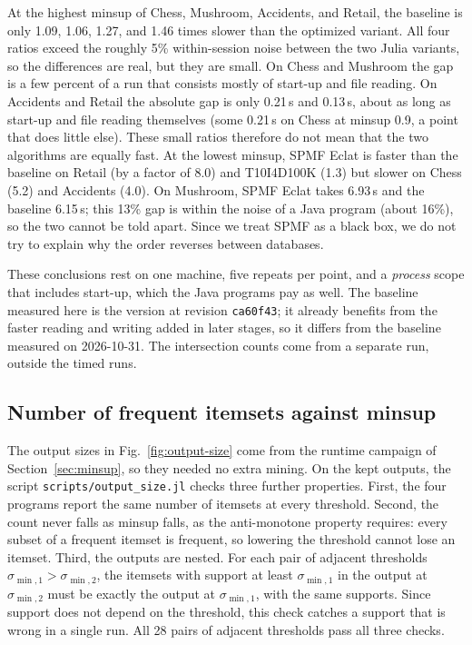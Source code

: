 At the highest minsup of Chess, Mushroom, Accidents, and Retail, the baseline is only 1.09,
1.06, 1.27, and 1.46 times slower than the optimized variant. All four ratios exceed the
roughly 5\% within-session noise between the two Julia variants, so the differences are
real, but they are small. On Chess and Mushroom the gap is a few percent of a run that
consists mostly of start-up and file reading. On Accidents and Retail the absolute gap is
only 0.21\,s and 0.13\,s, about as long as start-up and file reading themselves (some
0.21\,s on Chess at minsup 0.9, a point that does little else). These small ratios
therefore do not mean that the two algorithms are equally fast. At the lowest minsup,
SPMF Eclat is faster than the baseline on Retail (by a factor of 8.0) and T10I4D100K (1.3)
but slower on Chess (5.2) and Accidents (4.0). On Mushroom, SPMF Eclat takes 6.93\,s and
the baseline 6.15\,s; this 13\% gap is within the noise of a Java program (about 16\%), so
the two cannot be told apart. Since we treat SPMF as a black box, we do not try to explain
why the order reverses between databases.

These conclusions rest on one machine, five repeats per point, and a \emph{process} scope
that includes start-up, which the Java programs pay as well. The baseline measured here is
the version at revision \texttt{ca60f43}; it already benefits from the faster reading and
writing added in later stages, so it differs from the baseline measured on 2026-10-31.
The intersection counts come from a separate run, outside the timed runs.

\subsection{Number of frequent itemsets against minsup}
\label{sec:output-size}
The output sizes in Fig.~\ref{fig:output-size} come from the runtime campaign of
Section~\ref{sec:minsup}, so they needed no extra mining. On the kept outputs, the script
\texttt{scripts/output\_size.jl} checks three further properties. First, the four programs
report the same number of itemsets at every threshold. Second, the count never falls as
minsup falls, as the anti-monotone property requires: every subset of a frequent itemset
is frequent, so lowering the threshold cannot lose an itemset. Third, the outputs are
nested. For each pair of adjacent thresholds $\sigma_{\min,1} > \sigma_{\min,2}$, the
itemsets with support at least $\sigma_{\min,1}$ in the output at $\sigma_{\min,2}$ must
be exactly the output at $\sigma_{\min,1}$, with the same supports. Since support does not
depend on the threshold, this check catches a support that is wrong in a single run. All
28 pairs of adjacent thresholds pass all three checks.

